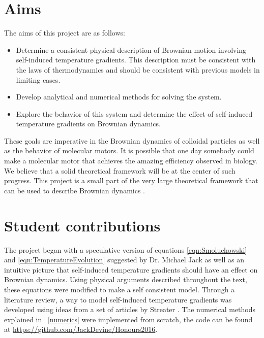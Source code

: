 \section{Aims}
The aims of this project are as follows:
\begin{itemize}
\item{Determine a consistent physical description of Brownian motion involving self-induced temperature gradients. This description must be consistent with the laws of thermodynamics and should be consistent with previous models in limiting cases.}
\item{Develop analytical and numerical methods for solving the system.}
\item{Explore the behavior of this system and determine the effect of self-induced temperature gradients on Brownian dynamics.}
\end{itemize}
These goals are imperative in the Brownian dynamics of colloidal particles as well as the behavior of molecular motors. It is possible that one day somebody could make a molecular motor that achieves the amazing efficiency observed in biology. We believe that a solid theoretical framework will be at the center of such progress. This project is a small part of the very large theoretical framework that can be used to describe Brownian dynamics \cite{Astumian2007,KellerBustamante2000,leibler1990physical,Leibler1993}.
\section{Student contributions}
The project began with a speculative version of equations \ref{eqn:Smoluchowski} and \ref{eqn:TemperatureEvolution} suggested by Dr. Michael Jack as well as an intuitive picture that self-induced temperature gradients should have an effect on Brownian dynamics. Using physical arguments described throughout the text, these equations were modified to make a self consistent model. Through a literature review, a way to model self-induced temperature gradients was developed using ideas from a set of articles by Streater \cite{Streater1997, Streater1997a,Streater2000,Streater1997b}. The numerical methods explained in ~\autoref{numerics} were implemented from scratch, the code can be found at \href{url}{https://github.com/JackDevine/Honours2016}.
